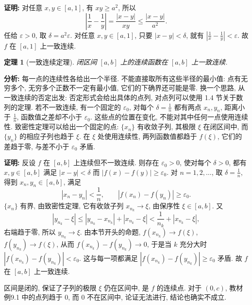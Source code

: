 \documentclass[UTF8,openany]{ctexbook}
\theoremstyle{chinesetextbook}
\newtheorem{theorem}{定理}[section]
\newenvironment{cnproof}{\par\indent\textbf{证明:} \ignorespaces}{\par}
\begin{document}
\begin{cnproof}
对任意 $x,y\in[a,1]$, 有 $xy\ge a^2$, 所以
\[
\left|\frac1x-\frac1y\right|=\frac{|x-y|}{xy}\le\frac{|x-y|}{a^2}.
\]
任给 $\varepsilon>0$, 取 $\delta=a^2\varepsilon$. 对任意 $x,y\in[a,1]$, 只要 $|x-y|<\delta$, 就有 $\displaystyle\left|\frac1x-\frac1y\right|<\varepsilon$. 故 $f$ 在 $[a,1]$ 上一致连续.
\end{cnproof}
\begin{theorem}[一致连续定理]
闭区间 $[a,b]$ 上的连续函数在 $[a,b]$ 上一致连续.
\end{theorem}
\par\indent\textbf{分析:} 每一点的连续性各给出一个半径. 不能直接取所有这些半径的最小值: 点有无穷多个, 无穷多个正数不一定有最小值, 它们的下确界还可能是零. 换一个思路, 从一致连续的否定出发: 否定形式会给出具体的点列, 对点列可以使用 1.4 节关于数列的定理. 若不一致连续, 有一个固定的 $\varepsilon_0$, 对每个 $\displaystyle\delta=\frac1n$ 都有两点 $x_n,y_n$, 距离小于 $\displaystyle\frac1n$, 函数值之差却不小于 $\varepsilon_0$. 这些点的位置在变化, 不能对其中任何一点使用连续性. 致密性定理可以给出一个固定的点: $\{x_n\}$ 有收敛子列, 其极限 $\xi$ 在闭区间中, 而 $\{y_n\}$ 的相应子列也趋于 $\xi$. 在 $\xi$ 处使用连续性, 两列函数值都趋于 $f(\xi)$, 它们的差趋于零, 与差不小于 $\varepsilon_0$ 矛盾.
\begin{cnproof}
反设 $f$ 在 $[a,b]$ 上连续但不一致连续. 则存在 $\varepsilon_0>0$, 使对每个 $\delta>0$, 都有 $x,y\in[a,b]$ 满足 $|x-y|<\delta$ 而 $|f(x)-f(y)|\ge\varepsilon_0$. 对 $n=1,2,\ldots$, 取 $\displaystyle\delta=\frac1n$, 得到 $x_n,y_n\in[a,b]$, 满足
\[
|x_n-y_n|<\frac1n,\qquad|f(x_n)-f(y_n)|\ge\varepsilon_0.
\]
$\{x_n\}$ 有界, 由致密性定理, 它有收敛子列 $x_{n_k}\to\xi$, 由保序性 $\xi\in[a,b]$. 又
\[
|y_{n_k}-\xi|\le|y_{n_k}-x_{n_k}|+|x_{n_k}-\xi|<\frac1{n_k}+|x_{n_k}-\xi|,
\]
右端趋于零, 所以 $y_{n_k}\to\xi$. 由本节开头的命题, $f(x_{n_k})\to f(\xi)$, $f(y_{n_k})\to f(\xi)$, 从而 $f(x_{n_k})-f(y_{n_k})\to0$, 于是当 $k$ 充分大时 $|f(x_{n_k})-f(y_{n_k})|<\varepsilon_0$. 这与每一项都满足 $|f(x_{n_k})-f(y_{n_k})|\ge\varepsilon_0$ 矛盾. 故 $f$ 在 $[a,b]$ 上一致连续.
\end{cnproof}
区间是闭的, 保证了子列的极限 $\xi$ 仍在区间中, 是 $f$ 的连续点. 对于 $(0,c)$, 教材例9.1 中的点列趋于 $0$, 而 $0$ 不在区间中, 论证无法进行, 结论也确实不成立.
\end{document}
